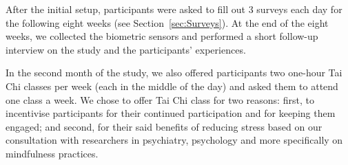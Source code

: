 After the initial setup, participants were asked to fill out 3 surveys each day for the following eight weeks (see Section~\ref{sec:Surveys}). At the end of the eight weeks, we collected the biometric sensors and performed a short follow-up interview on the study and the participants' experiences.

In the second month of the study, we also offered participants two one-hour Tai Chi classes per week (each in the middle of the day) and asked them to attend one class a week. We chose to offer Tai Chi class for two reasons: first, to incentivise participants for their continued participation and for keeping them engaged; and second, for their said benefits of reducing stress based on our consultation with researchers in psychiatry, psychology and more specifically on mindfulness practices. 


